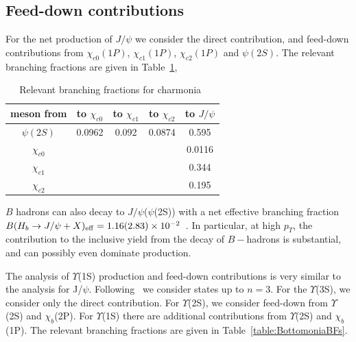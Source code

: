 \documentclass[aps,prc,preprint,superscriptaddress,showpacs,showkeys,amsmath]{revtex4-1}
\begin{document}
\subsection{Feed-down contributions}

For the net production of $J/\psi$ we consider the direct contribution, and
feed-down contributions from $\chi_{c0}(1P)$, $\chi_{c1}(1P)$,
$\chi_{c2}(1P)$ and $\psi(2S)$. The relevant branching fractions are given
in Table~\ref{table:CharmoniaBFs},

\begin{table}[h]
\begin{tabular}{c|cccc}
meson from &to $\chi_{c0}$ &to $\chi_{c1}$ &to $\chi_{c2}$ &to $J/\psi$\\ 
\hline
$\psi(2S)$ & 0.0962 & 0.092 & 0.0874 & 0.595   \\
$\chi_{c0}$& &  &  & 0.0116           \\
$\chi_{c1}$& &  &  & 0.344           \\
$\chi_{c2}$& &  &  & 0.195           \\
\end{tabular}
\caption{Relevant branching fractions for charmonia~\cite{Nakamura:2010zzi}}
\label{table:CharmoniaBFs}
\end{table}

$B$ hadrons can also decay to $J/\psi$($\psi$(2S)) with a net effective branching fraction
$B(H_b\rightarrow J/\psi+X)_{\rm {eff}} =1.16(2.83)\times10^{-2}$~\cite{Acosta:2004yw}. 
In particular, at high $p_T$, the contribution to the inclusive yield from the decay of $B-$hadrons is
substantial, and can possibly even dominate production.

The analysis of $\Upsilon$(1S) production and feed-down contributions is very
similar to the analysis for J/$\psi$. Following~\cite{Cho:1995ce,Cho:1995vh}
we consider states up to $n=3$. For the $\Upsilon$(3S), we consider only the
direct contribution. For $\Upsilon$(2S), we consider feed-down from
$\Upsilon$(2S) and $\chi_b$(2P). For $\Upsilon$(1S) there are additional
contributions from $\Upsilon$(2S) and $\chi_b$(1P). The relevant branching
fractions are given in Table~\ref{table:BottomoniaBFs}.
\end{document}
